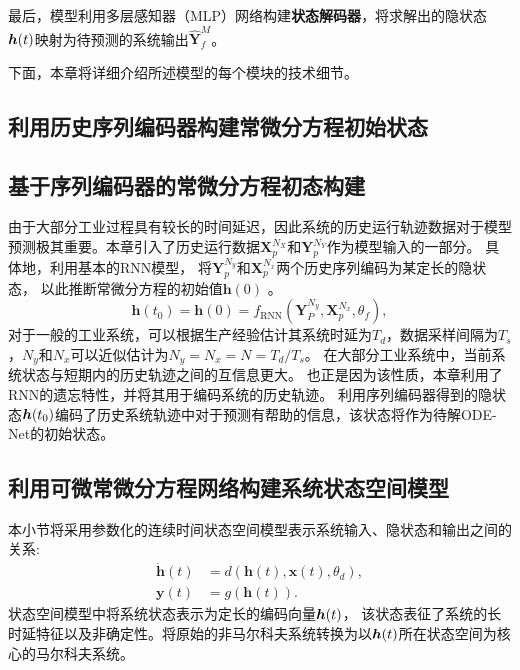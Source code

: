 最后，模型利用多层感知器（MLP）网络构建\textbf{状态解码器}，将求解出的隐状态$\boldsymbol h(t)$映射为待预测的系统输出$\hat{\boldsymbol{Y}}_{f}^{M}$。

下面，本章将详细介绍所述模型的每个模块的技术细节。


\subsection{利用历史序列编码器构建常微分方程初始状态}
\subsection{基于序列编码器的常微分方程初态构建}
由于大部分工业过程具有较长的时间延迟，因此系统的历史运行轨迹数据对于模型预测极其重要。本章引入了历史运行数据$\boldsymbol {X}_{p}^{N_{X}}$和$\boldsymbol {Y}_{p}^{N_{Y}}$作为模型输入的一部分。
具体地，利用基本的RNN模型，
将$\boldsymbol{Y}_p^{N_y}$和$\boldsymbol {X}_p^{N_x}$两个历史序列编码为某定长的隐状态，
以此推断常微分方程的初始值$\boldsymbol{h}(0)$ 。
\begin{equation}
\label{equ:rnn_encoder}
 \boldsymbol{h}(t_0) = \boldsymbol{h}(0) = f_{\text{RNN}}(\boldsymbol{Y}_P^{N_y},\boldsymbol X_p^{N_x},\theta _f),
\end{equation}
对于一般的工业系统，可以根据生产经验估计其系统时延为$T_d$，数据采样间隔为$T_s$，$N_y$和$N_x$可以近似估计为$N_y = N_x = N = T_d/T_s$。
在大部分工业系统中，当前系统状态与短期内的历史轨迹之间的互信息更大。
也正是因为该性质，本章利用了RNN的遗忘特性，并将其用于编码系统的历史轨迹。
利用序列编码器得到的隐状态$\boldsymbol h(t_0)$编码了历史系统轨迹中对于预测有帮助的信息，该状态将作为待解ODE-Net的初始状态。

\subsection{利用可微常微分方程网络构建系统状态空间模型}
\label{sec:ODE-Net}
本小节将采用参数化的连续时间状态空间模型表示系统输入、隐状态和输出之间的关系:
\begin{equation}
    \begin{aligned}
     \dot{\boldsymbol h}(t)&=d(\boldsymbol{h}(t), \boldsymbol{x}(t), \theta _d),\\
\boldsymbol{y}(t)&=g(\boldsymbol{h}(t)).
    \end{aligned}
    \label{equ:ct_state_space}
\end{equation}
状态空间模型中将系统状态表示为定长的编码向量$\boldsymbol h(t)$，
该状态表征了系统的长时延特征以及非确定性。将原始的非马尔科夫系统转换为以$\boldsymbol h(t)$所在状态空间为核心的马尔科夫系统。

